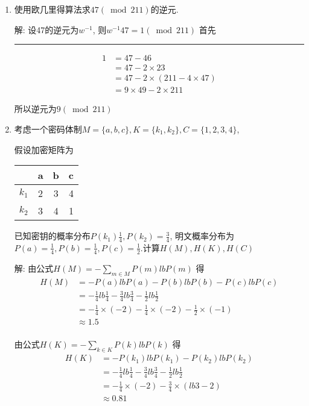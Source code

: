 \documentclass[UTF8]{ctexart}
\newcommand\hl{\bgroup\markoverwith
  {\textcolor{yellow}{\rule[-.5ex]{2pt}{2.5ex}}}\ULon}
\begin{document}
\begin{enumerate}
        \item 使用欧几里得算法求$47(\bmod 211)$的逆元.

        解: 设47的逆元为$w^{-1}$, 则$w^{-1}47=1(\bmod 211)$
        首先\hl{辗转相除法}
        $$
        \begin{aligned}
          1&=47-46\\
           &=47-2\times 23\\
           &=47-2\times (211-4\times 47)\\
           &=9\times 49 - 2\times 211
        \end{aligned}
        $$

        所以逆元为$9(\bmod 211)$

        \item 考虑一个密码体制$M=\{a,b,c\}, K=\{k_1,k_2\}, C=\{1,2,3,4\}$,

        假设加密矩阵为
        \begin{tabular}{|c|c|c|c|}
          \hline
           &a &b &c\\
          \hline
          $k_1$ &2 &3 &4\\
          \hline
          $k_2$ &3 &4 &1\\
          \hline
        \end{tabular}

        已知密钥的概率分布$P(k_1)\frac{1}{4}, P(k_2)=\frac{3}{4}$, 明文概率分布为$P(a)=\frac{1}{4}, P(b)=\frac{1}{4}, P(c)=\frac{1}{2}$.计算$H(M), H(K), H(C)$

        解: 由公式$H(M)=-\sum\limits_{m\in M}P(m)lbP(m)$
        得$$
        \begin{aligned}
          H(M)&=-P(a)lbP(a)-P(b)lbP(b)-P(c)lbP(c)\\
              &=-\frac{1}{4}lb\frac{1}{4}-\frac{3}{4}lb\frac{3}{4}-\frac{1}{2}lb\frac{1}{2}\\
              &=-\frac{1}{4}\times (-2)-\frac{1}{4}\times (-2)-\frac{1}{2}\times (-1)\\
              &\approx 1.5\\
        \end{aligned}
        $$

        由公式$H(K)=-\sum\limits_{k\in K}P(k)lbP(k)$
        得$$
        \begin{aligned}
          H(K)&=-P(k_1)lbP(k_1)-P(k_2)lbP(k_2)\\
              &=-\frac{1}{4}lb\frac{1}{4}-\frac{3}{4}lb\frac{3}{4}-\frac{1}{2}lb\frac{1}{2}\\
              &=-\frac{1}{4}\times (-2)-\frac{3}{4}\times (lb3-2)\\
              &\approx 0.81\\
        \end{aligned}
        $$


\end{enumerate}
\end{document}
